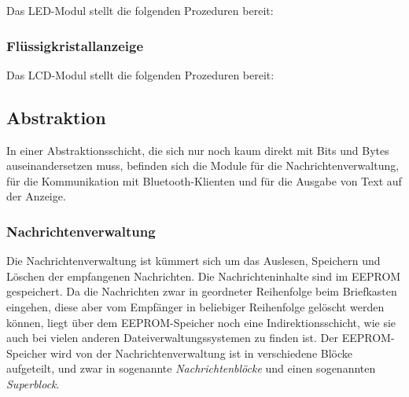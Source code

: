 \documentclass[ngerman]{article}
\begin{document}
Das LED-Modul stellt die folgenden Prozeduren bereit:



\subsubsection{Flüssigkristallanzeige}

Das LCD-Modul stellt die folgenden Prozeduren bereit:



\subsection{Abstraktion}

In einer Abstraktionsschicht, die sich nur noch kaum direkt mit Bits und Bytes
auseinandersetzen muss, befinden sich die Module für die
Nachrichtenverwaltung, für die Kommunikation mit Bluetooth-Klienten
und für die Ausgabe von Text auf der Anzeige.


\subsubsection{Nachrichtenverwaltung}

Die Nachrichtenverwaltung ist kümmert sich um das Auslesen, Speichern und Löschen
der empfangenen Nachrichten. Die Nachrichteninhalte sind im EEPROM gespeichert.
Da die Nachrichten zwar in geordneter Reihenfolge beim Briefkasten eingehen, diese aber
vom Empfänger in beliebiger Reihenfolge gelöscht werden können, liegt über dem
EEPROM-Speicher noch eine In\-di\-rek\-tions\-schicht, wie sie auch bei vielen anderen
Dateiverwaltungssystemen zu finden ist. Der EEPROM-Speicher wird von der
Nachrichtenverwaltung ist in verschiedene Blöcke aufgeteilt, und zwar in
sogenannte \textit{Nachrichtenblöcke} und einen sogenannten
\textit{Superblock}.

\end{document}
